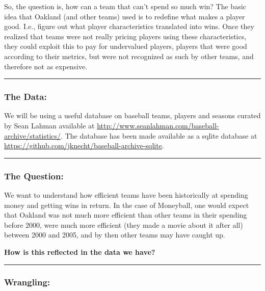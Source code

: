 \documentclass[]{article}
\begin{document}
So, the question is, how can a team that can't spend so much win? The
basic idea that Oakland (and other teams) used is to redefine what makes
a player good. I.e., figure out what player characteristics translated
into wins. Once they realized that teams were not really pricing players
using these characteristics, they could exploit this to pay for
undervalued players, players that were good according to their metrics,
but were not recognized as such by other teams, and therefore not as
expensive.

\begin{center}\rule{0.5\linewidth}{\linethickness}\end{center}

\subsubsection{The Data:}\label{the-data}

We will be using a useful database on baseball teams, players and
seasons curated by Sean Lahman available at
\url{http://www.seanlahman.com/baseball-archive/statistics/}. The
database has been made available as a sqlite database at
\url{https://github.com/jknecht/baseball-archive-sqlite}.

\begin{center}\rule{0.5\linewidth}{\linethickness}\end{center}

\subsubsection{The Question:}\label{the-question}

We want to understand how efficient teams have been historically at
spending money and getting wins in return. In the case of Moneyball, one
would expect that Oakland was not much more efficient than other teams
in their spending before 2000, were much more efficient (they made a
movie about it after all) between 2000 and 2005, and by then other teams
may have caught up.

\textbf{How is this reflected in the data we have?}

\begin{center}\rule{0.5\linewidth}{\linethickness}\end{center}

\subsubsection{Wrangling:}\label{wrangling}
\end{document}
